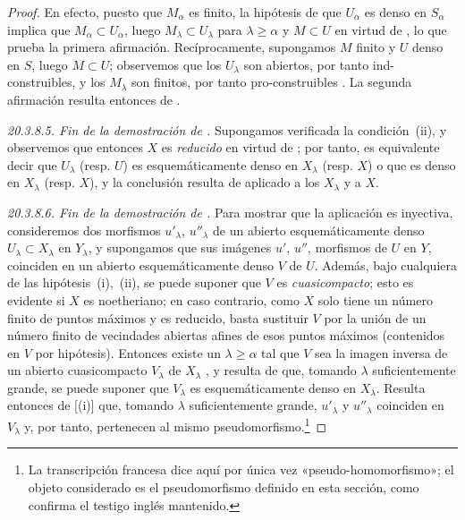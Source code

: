 \begin{proof}
En efecto, puesto que $M_\alpha$ es finito, la hipótesis de que $U_\alpha$ es denso en $S_\alpha$ implica que
 $M_\alpha\subset U_\alpha$, luego $M_\lambda\subset U_\lambda$ para $\lambda\geq\alpha$ y $M\subset U$ en virtud de , lo que prueba la primera afirmación.
Recíprocamente, supongamos $M$ finito y $U$ denso en $S$, luego $M\subset U$; observemos que los $U_\lambda$ son abiertos, por tanto ind-construibles, y los $M_\lambda$ son finitos, por tanto pro-construibles .
La segunda afirmación resulta entonces de .

\label{IV.20.3.8.5}
\emph{20.3.8.5. Fin de la demostración de .}
Supongamos verificada la condición~(ii), y observemos que entonces $X$ es \emph{reducido} en virtud de ; por tanto, es equivalente decir que $U_\lambda$ (resp. $U$) es esquemáticamente denso en $X_\lambda$ (resp. $X$) o que es denso en $X_\lambda$ (resp. $X$), y la conclusión resulta de  aplicado a los $X_\lambda$ y a $X$.

\label{IV.20.3.8.6}
\emph{20.3.8.6. Fin de la demostración de .}
Para mostrar que la aplicación  es inyectiva, consideremos dos morfismos $u'_\lambda$, $u''_\lambda$ de un abierto esquemáticamente denso $U_\lambda\subset X_\lambda$ en $Y_\lambda$, y supongamos que sus imágenes $u'$, $u''$, morfismos de $U$ en $Y$, coinciden en un abierto esquemáticamente denso $V$ de $U$.
Además, bajo cualquiera de las hipótesis~(i),~(ii), se puede suponer que $V$ es \emph{cuasicompacto}; esto es evidente si $X$ es noetheriano; en caso contrario, como $X$ solo tiene un número finito de puntos máximos y es reducido, basta sustituir $V$ por la unión de un número finito de vecindades abiertas afines de esos puntos máximos (contenidos en $V$ por hipótesis).
Entonces existe un $\lambda\geq\alpha$ tal que $V$ sea la imagen inversa de un abierto cuasicompacto $V_\lambda$ de $X_\lambda$ , y resulta de  que, tomando $\lambda$ suficientemente grande, se puede suponer que $V_\lambda$ es esquemáticamente denso en $X_\lambda$.
Resulta entonces de [(i)] que, tomando $\lambda$ suficientemente grande, $u'_\lambda$ y $u''_\lambda$ coinciden en $V_\lambda$ y, por tanto, pertenecen al mismo pseudomorfismo.\footnote{La transcripción francesa dice aquí por única vez «pseudo-homomorfismo»; el objeto considerado es el pseudomorfismo definido en esta sección, como confirma el testigo inglés mantenido.}


\end{proof}
